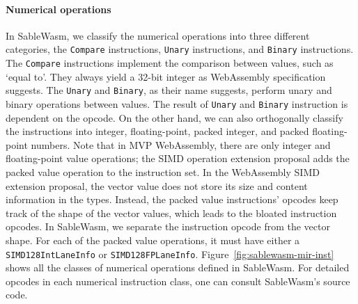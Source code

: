 \paragraph{Numerical operations}
In SableWasm, we classify the numerical operations into three different
categories, the \texttt{Compare} instructions, \texttt{Unary} instructions, and
\texttt{Binary} instructions. The \texttt{Compare} instructions implement the
comparison between values, such as `equal to'. They always yield a 32-bit
integer as WebAssembly specification suggests. The \texttt{Unary} and
\texttt{Binary}, as their name suggests, perform unary and binary operations
between values. The result of \texttt{Unary} and \texttt{Binary} instruction is
dependent on the opcode. On the other hand, we can also orthogonally classify
the instructions into integer, floating-point, packed integer, and packed
floating-point numbers. Note that in MVP WebAssembly, there are only integer and
floating-point value operations; the SIMD operation extension proposal adds the
packed value operation to the instruction set. In the WebAssembly SIMD extension
proposal, the vector value does not store its size and content information in
the types. Instead, the packed value instructions' opcodes keep track of the
shape of the vector values, which leads to the bloated instruction opcodes. In
SableWasm, we separate the instruction opcode from the vector shape. For each of
the packed value operations, it must have either a \texttt{SIMD128IntLaneInfo}
or \texttt{SIMD128FPLaneInfo}. Figure~\ref{fig:sablewasm-mir-inst} shows all the
classes of numerical operations defined in SableWasm. For detailed opcodes in
each numerical instruction class, one can consult SableWasm's source code.

